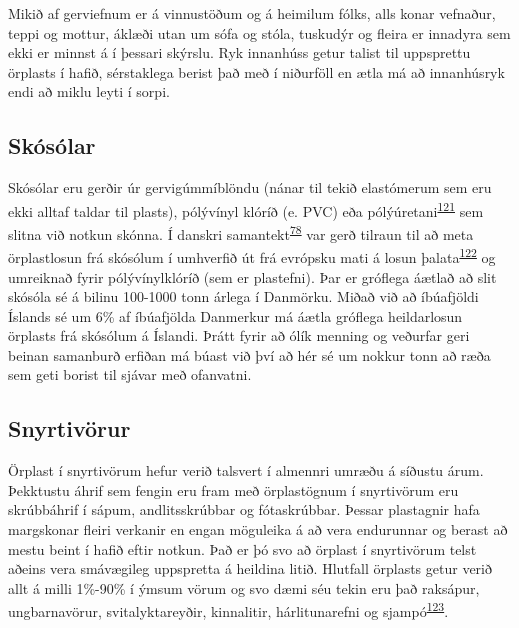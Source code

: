\documentclass[icelandic,]{book}
\begin{document}
Mikið af gerviefnum er á vinnustöðum og á heimilum fólks, alls konar vefnaður, teppi og mottur, áklæði utan um sófa og stóla, tuskudýr og fleira er innadyra sem ekki er minnst á í þessari skýrslu. Ryk innanhúss getur talist til uppsprettu örplasts í hafið, sérstaklega berist það með í niðurföll en ætla má að innanhúsryk endi að miklu leyti í sorpi.


\hypertarget{skosolar}{%
\subsection*{Skósólar}\label{skosolar}}

Skósólar eru gerðir úr gervigúmmíblöndu (nánar til tekið elastómerum sem eru ekki alltaf taldar til plasts), pólývínyl klóríð (e. PVC) eða pólýúretani\textsuperscript{\protect\hyperlink{ref-karak2009fundamentals}{121}} sem slitna við notkun skónna. Í danskri samantekt\textsuperscript{\protect\hyperlink{ref-lassen2015microplastics}{78}} var gerð tilraun til að meta örplastlosun frá skósólum í umhverfið út frá evrópsku mati á losun þalata\textsuperscript{\protect\hyperlink{ref-Pakalin2008}{122}} og umreiknað fyrir pólývínylklóríð (sem er plastefni). Þar er gróflega áætlað að slit skósóla sé á bilinu 100-1000 tonn árlega í Danmörku. Miðað við að íbúafjöldi Íslands sé um 6\% af íbúafjölda Danmerkur má áætla gróflega heildarlosun örplasts frá skósólum á Íslandi. Þrátt fyrir að ólík menning og veðurfar geri beinan samanburð erfiðan má búast við því að hér sé um nokkur tonn að ræða sem geti borist til sjávar með ofanvatni.

\hypertarget{snyrtivorur}{%
\subsection*{Snyrtivörur}\label{snyrtivorur}}

Örplast í snyrtivörum hefur verið talsvert í almennri umræðu á síðustu árum. Þekktustu áhrif sem fengin eru fram með örplastögnum í snyrtivörum eru skrúbbáhrif í sápum, andlitsskrúbbar og fótaskrúbbar. Þessar plastagnir hafa margskonar fleiri verkanir en engan möguleika á að vera endurunnar og berast að mestu beint í hafið eftir notkun. Það er þó svo að örplast í snyrtivörum telst aðeins vera smávægileg uppspretta á heildina litið.
Hlutfall örplasts getur verið allt á milli 1\%-90\% í ýmsum vörum og svo dæmi séu tekin eru það raksápur, ungbarnavörur, svitalyktareyðir, kinnalitir, hárlitunarefni og sjampó\textsuperscript{\protect\hyperlink{ref-Leslie2014}{123}}.
\end{document}
